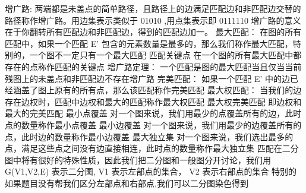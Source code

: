 {}增广路:\markdownRendererParagraphSeparator
{}两端都是未盖点的简单路径，且路径上的边满足匹配边和非匹配边交替的路径称作增广路。用边集表示类似于\markdownRendererDollarSign{} 01010 \markdownRendererDollarSign{},用点集表示即\markdownRendererDollarSign{} 0111110 \markdownRendererDollarSign{}增广路的意义在于你翻转所有匹配边和非匹配边，得到的匹配边加一。\markdownRendererParagraphSeparator
{}最大匹配：\markdownRendererParagraphSeparator
{}在图的所有匹配中，如果一个匹配\markdownRendererDollarSign{} E\markdownRendererCircumflex{}\markdownRendererLeftBrace{}'\markdownRendererRightBrace{} \markdownRendererDollarSign{}包含的元素数量是最多的，那么我们称作最大匹配，特别的，一个图不一定只有一个最大匹配\markdownRendererParagraphSeparator
{}匹配关键点\markdownRendererParagraphSeparator
{}在一个图的所有最大匹配中都存在的点称作匹配的关键点\markdownRendererParagraphSeparator
{}增广路定理：\markdownRendererParagraphSeparator
{}一个匹配是图的最大匹配当且仅当当前残图上的未盖点和非匹配边不存在增广路\markdownRendererParagraphSeparator
{}完美匹配：\markdownRendererParagraphSeparator
{}如果一个匹配\markdownRendererDollarSign{} E\markdownRendererCircumflex{}\markdownRendererLeftBrace{}'\markdownRendererRightBrace{} \markdownRendererDollarSign{}中的边已经涵盖了图上原有的所有点，那么该匹配称作完美匹配\markdownRendererParagraphSeparator
{}最大权匹配：\markdownRendererParagraphSeparator
{}当我们的边存在边权时，匹配中边权和最大的匹配称作最大权匹配\markdownRendererParagraphSeparator
{}最大权完美匹配\markdownRendererParagraphSeparator
{}即边权和最大的完美匹配\markdownRendererParagraphSeparator
{}最小点覆盖\markdownRendererParagraphSeparator
{}对一个图来说，我们用最少的点覆盖所有的边，此时点的数量称作最小点覆盖\markdownRendererParagraphSeparator
{}最小边覆盖\markdownRendererParagraphSeparator
{}对一个图来说，我们用最少的边覆盖所有的点，此时边的数量称作最小边覆盖\markdownRendererParagraphSeparator
{}最大独立集\markdownRendererParagraphSeparator
{}对一个图来说，我们选出最多的点，满足这些点之间没有边直接相连，此时点的数量称作最大独立集\markdownRendererInterblockSeparator
{}
\markdownRendererSectionEnd \markdownRendererSectionBegin
{}\markdownRendererInterblockSeparator
{}匹配在二分图中将有很好的特殊性质，因此我们把二分图和一般图分开讨论，我们用\markdownRendererDollarSign{} G(V1,V2,E) \markdownRendererDollarSign{}表示二分图,\markdownRendererDollarSign{} V1 \markdownRendererDollarSign{}表示左部点的集合，\markdownRendererDollarSign{} V2 \markdownRendererDollarSign{}表示右部点的集合\markdownRendererParagraphSeparator
{}特别的如果题目没有帮我们区分左部点和右部点,我们可以二分图染色得到\markdownRendererInterblockSeparator
